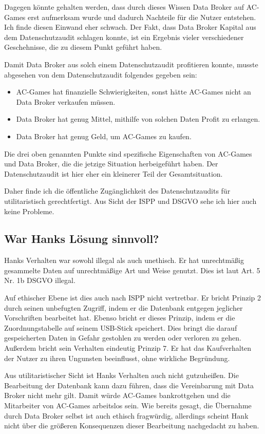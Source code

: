 Dagegen könnte gehalten werden, dass durch dieses Wissen Data Broker auf AC-Games erst aufmerksam wurde und dadurch Nachteile für die Nutzer entstehen. Ich finde diesen Einwand eher schwach. Der Fakt, dass Data Broker Kapital aus dem Datenschutzaudit schlagen konnte, ist ein Ergebnis vieler verschiedener Geschehnisse, die zu diesem Punkt geführt haben.

Damit Data Broker aus solch einem Datenschutzaudit profitieren konnte, musste abgesehen von dem Datenschutzaudit folgendes gegeben sein:
\begin{itemize}
    \item AC-Games hat finanzielle Schwierigkeiten, sonst hätte AC-Games nicht an Data Broker verkaufen müssen. 
    \item Data Broker hat genug Mittel, mithilfe von solchen Daten Profit zu erlangen.
    \item Data Broker hat genug Geld, um AC-Games zu kaufen.
\end{itemize}
Die drei oben genannten Punkte sind spezifische Eigenschaften von AC-Games und Data Broker, die die jetzige Situation herbeigeführt haben. 
Der Datenschutzaudit ist hier eher ein kleinerer Teil der Gesamtsituation.

Daher finde ich die öffentliche Zugänglichkeit des Datenschutzaudits für utilitaristisch gerechtfertigt. Aus Sicht der ISPP und DSGVO sehe ich hier auch keine Probleme.

\subsection{War Hanks Lösung sinnvoll? \cite{kees_faites_2017}}

Hanks Verhalten war sowohl illegal als auch unethisch.
Er hat unrechtmäßig gesammelte Daten auf unrechtmäßige Art und Weise genutzt.
Dies ist laut Art. 5 Nr. 1b DSGVO illegal.

Auf ethischer Ebene ist dies auch nach ISPP nicht vertretbar.
Er bricht Prinzip 2 durch seinen unbefugten Zugriff, indem er die Datenbank entgegen jeglicher Vorschriften bearbeitet hat. Ebenso bricht er dieses Prinzip, indem er die Zuordnungstabelle auf seinem USB-Stick speichert.
Dies bringt die darauf gespeicherten Daten in Gefahr gestohlen zu werden oder verloren zu gehen.
Außerdem bricht sein Verhalten eindeutig Prinzip 7.
Er hat das Kaufverhalten der Nutzer zu ihren Ungunsten beeinflusst, ohne wirkliche Begründung.

Aus utilitaristischer Sicht ist Hanks Verhalten auch nicht gutzuheißen.
Die Bearbeitung der Datenbank kann dazu führen, dass die Vereinbarung mit Data Broker nicht mehr gilt. Damit würde AC-Games bankrottgehen und die Mitarbeiter von AC-Games arbeitslos sein.
Wie bereits gesagt, die Übernahme durch Data Broker selbst ist auch ethisch fragwürdig, allerdings scheint Hank nicht über die größeren Konsequenzen dieser Bearbeitung nachgedacht zu haben.

